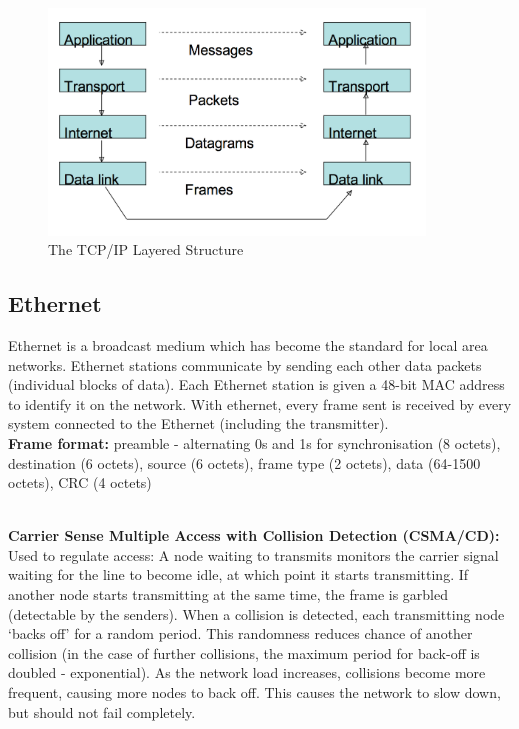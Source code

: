 \documentclass[a4paper,oneside]{report}
\begin{document}
    	\begin{figure}[h!]
    	    \begin{center}
    		\includegraphics[width=100mm]{layering.png}
    		\caption{The TCP/IP Layered Structure}
    		\end{center}
    	\end{figure}
    	
    	\subsection{Ethernet}
    	Ethernet is a broadcast medium which has become the standard for local area networks. Ethernet stations communicate by sending each other data packets (individual blocks of data). Each Ethernet station is given a 48-bit MAC address to identify it on the network. With ethernet, every frame sent is received by every system connected to the Ethernet (including the transmitter).\\
    	
\noindent\textbf{Frame format:}
preamble - alternating 0s and 1s for synchronisation (8 octets), destination (6 octets), source (6 octets), frame type (2 octets), data (64-1500 octets), CRC (4 octets)
    	    	
\ \\ \textbf{Carrier Sense Multiple Access with Collision Detection (CSMA/CD):} Used to regulate access: A node waiting to transmits monitors the carrier signal waiting for the line to become idle, at which point it starts transmitting. If another node starts transmitting at the same time, the frame is garbled (detectable by the senders). When a collision is detected, each transmitting node ‘backs off’ for a random period. This randomness reduces chance of another collision (in the case of further collisions, the maximum period for back-off is doubled - exponential). As the network load increases, collisions become more frequent, causing more nodes to back off. This causes the network to slow down, but should not fail completely.
    	
\end{document}
